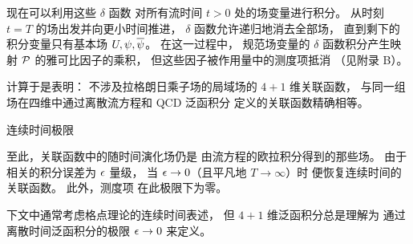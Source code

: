 现在可以利用这些 $\delta$ 函数
对所有流时间 $t>0$ 处的场变量进行积分。
从时刻 $t=T$ 的场出发并向更小时间推进，
$\delta$ 函数允许递归地消去全部场，
直到剩下的积分变量只有基本场 $U,\psi,\overline{\psi}$。
在这一过程中，
规范场变量的 $\delta$ 函数积分产生映射 ${\cal P}$
的雅可比因子的乘积，
但这些因子被作用量中的测度项抵消
（见附录 B）。

计算于是表明：
不涉及拉格朗日乘子场的局域场的 $4+1$ 维关联函数，
与同一组场在四维中通过离散流方程和 QCD 泛函积分
定义的关联函数精确相等。


 连续时间极限

至此，关联函数中的随时间演化场仍是
由流方程的欧拉积分得到的那些场。
由于相关的积分误差为 $\epsilon$ 量级，
当 $\epsilon\to0$（且平凡地 $T\to\infty$）时
便恢复连续时间的关联函数。
此外，测度项
在此极限下为零。

下文中通常考虑格点理论的连续时间表述，
但 $4+1$ 维泛函积分总是理解为
通过离散时间泛函积分的极限 $\epsilon\to0$ 来定义。
